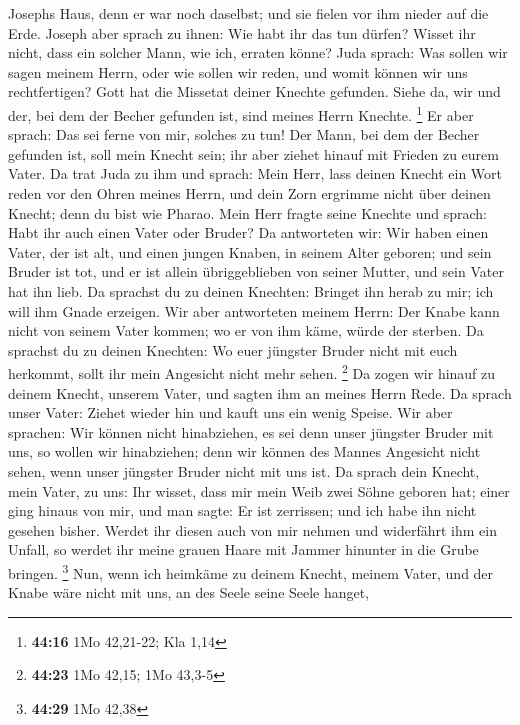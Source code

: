 Josephs Haus, denn er war noch daselbst; und sie fielen vor ihm nieder
auf die Erde.  Joseph aber sprach zu ihnen: Wie habt ihr
das tun dürfen? Wisset ihr nicht, dass ein solcher Mann, wie ich,
erraten könne?  Juda sprach: Was sollen wir sagen meinem
Herrn, oder wie sollen wir reden, und womit können wir uns
rechtfertigen? Gott hat die Missetat deiner Knechte gefunden. Siehe da,
wir und der, bei dem der Becher gefunden ist, sind meines Herrn Knechte.
\footnote{\textbf{44:16} 1Mo 42,21-22; Kla 1,14}  Er aber
sprach: Das sei ferne von mir, solches zu tun! Der Mann, bei dem der
Becher gefunden ist, soll mein Knecht sein; ihr aber ziehet hinauf mit
Frieden zu eurem Vater.  Da trat Juda zu ihm und sprach:
Mein Herr, lass deinen Knecht ein Wort reden vor den Ohren meines Herrn,
und dein Zorn ergrimme nicht über deinen Knecht; denn du bist wie
Pharao.  Mein Herr fragte seine Knechte und sprach: Habt
ihr auch einen Vater oder Bruder?  Da antworteten wir: Wir
haben einen Vater, der ist alt, und einen jungen Knaben, in seinem Alter
geboren; und sein Bruder ist tot, und er ist allein übriggeblieben von
seiner Mutter, und sein Vater hat ihn lieb.  Da sprachst du
zu deinen Knechten: Bringet ihn herab zu mir; ich will ihm Gnade
erzeigen.  Wir aber antworteten meinem Herrn: Der Knabe
kann nicht von seinem Vater kommen; wo er von ihm käme, würde der
sterben.  Da sprachst du zu deinen Knechten: Wo euer
jüngster Bruder nicht mit euch herkommt, sollt ihr mein Angesicht nicht
mehr sehen. \footnote{\textbf{44:23} 1Mo 42,15; 1Mo 43,3-5}
 Da zogen wir hinauf zu deinem Knecht, unserem Vater, und
sagten ihm an meines Herrn Rede.  Da sprach unser Vater:
Ziehet wieder hin und kauft uns ein wenig Speise.  Wir aber
sprachen: Wir können nicht hinabziehen, es sei denn unser jüngster
Bruder mit uns, so wollen wir hinabziehen; denn wir können des Mannes
Angesicht nicht sehen, wenn unser jüngster Bruder nicht mit uns ist.
 Da sprach dein Knecht, mein Vater, zu uns: Ihr wisset,
dass mir mein Weib zwei Söhne geboren hat;  einer ging
hinaus von mir, und man sagte: Er ist zerrissen; und ich habe ihn nicht
gesehen bisher.  Werdet ihr diesen auch von mir nehmen und
widerfährt ihm ein Unfall, so werdet ihr meine grauen Haare mit Jammer
hinunter in die Grube bringen. \footnote{\textbf{44:29} 1Mo 42,38}
 Nun, wenn ich heimkäme zu deinem Knecht, meinem Vater, und
der Knabe wäre nicht mit uns, an des Seele seine Seele hanget,
